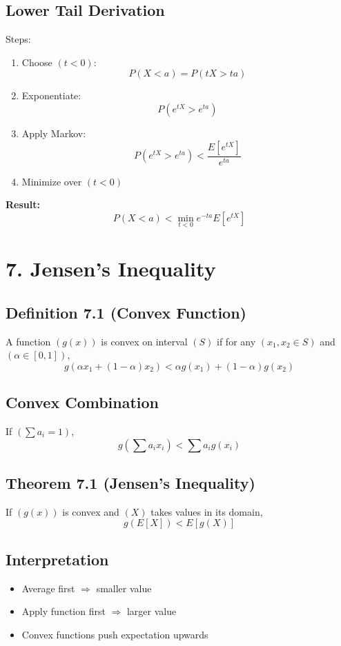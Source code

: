 \documentclass[11pt]{article}
\begin{document}
\subsection*{Lower Tail Derivation}

Steps:

\begin{enumerate}
\item Choose $( t < 0 )$:
\[
P(X < a) = P(tX > ta)
\]
\item Exponentiate:
\[
P(e^{tX} > e^{ta})
\]
\item Apply Markov:
\[
P(e^{tX} > e^{ta}) < \frac{E[e^{tX}]}{e^{ta}}
\]
\item Minimize over $( t < 0 )$
\end{enumerate}

\textbf{Result:}
\[
P(X < a) < \min_{t<0} e^{-ta} E[e^{tX}]
\]

\section*{7. Jensen’s Inequality}

\subsection*{Definition 7.1 (Convex Function)}

A function $( g(x) )$ is convex on interval $( S )$ if for any $( x_1, x_2 \in S )$ and $( \alpha \in [0,1] )$,
\[
g(\alpha x_1 + (1-\alpha)x_2) < \alpha g(x_1) + (1-\alpha)g(x_2)
\]

\subsection*{Convex Combination}

If $( \sum a_i = 1 )$,
\[
g\left(\sum a_i x_i\right) < \sum a_i g(x_i)
\]

\subsection*{Theorem 7.1 (Jensen’s Inequality)}

If $( g(x) )$ is convex and $( X )$ takes values in its domain,
\[
g(E[X]) < E[g(X)]
\]

\subsection*{Interpretation}

\begin{itemize}
\item Average first $\Rightarrow$ smaller value
\item Apply function first $\Rightarrow$ larger value
\item Convex functions push expectation upwards
\end{itemize}
\end{document}
